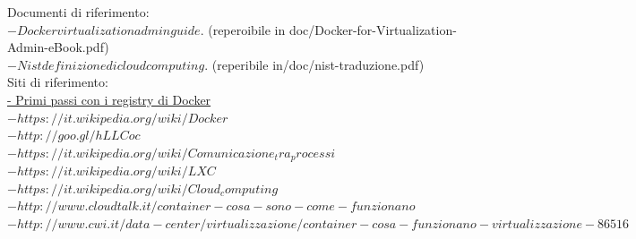 \documentclass[a4paper,12pt,openright,twoside]{report}
\begin{document}
%
%
%
%
%
%
%
%
%
%
%
%







\Large
Documenti di riferimento:\\
\normalsize$- Docker virtualization admin guide.$ (reperoibile in doc/Docker-for-Virtualization-Admin-eBook.pdf)\\
$- Nist definizione di cloud computing.$ (reperibile in/doc/nist-traduzione.pdf)\\

\Large
Siti di riferimento:\\
\normalsize
\label{dockerRegister}\href{http://blog.octo.com/en/docker-registry-first-steps/}{- Primi passi con i registry di Docker}\\
\href{https://it.wikipedia.org/wiki/Docker}{$- https://it.wikipedia.org/wiki/Docker$}\\
\label{nameSpace}\href{http://goo.gl/hLLCoc}{$- http://goo.gl/hLLCoc$}\\
\href{https://it.wikipedia.org/wiki/Comunicazione_tra_processi}{$- https://it.wikipedia.org/wiki/Comunicazione_tra_processi$}\\
\label{LXC}\href{https://it.wikipedia.org/wiki/LXC}{$- https://it.wikipedia.org/wiki/LXC$}\\
\href{https://it.wikipedia.org/wiki/Cloud_computing}{$- https://it.wikipedia.org/wiki/Cloud_computing$}\\
\href{$http://www.cloudtalk.it/container-cosa-sono-come-funzionano$}{$- http://www.cloudtalk.it/container-cosa-sono-come-funzionano$}\\
\href{http://www.cwi.it/data-center/virtualizzazione/container-cosa-funzionano-virtualizzazione-86516}{$- http://www.cwi.it/data-center/virtualizzazione/container-cosa-funzionano-virtualizzazione-86516$}\\
\end{document}
